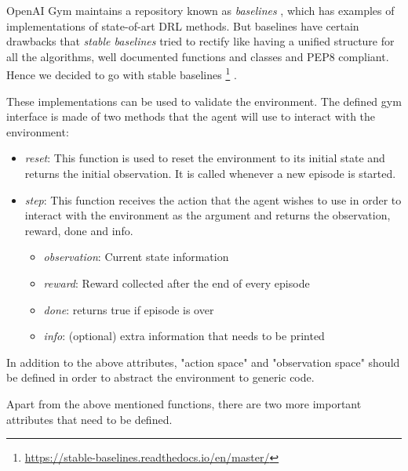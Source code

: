 \documentclass[12pt]{report}
\begin{document}
OpenAI Gym maintains a repository known as \emph{baselines} \cite{baselines}, which has examples of implementations of state-of-art DRL methods. But baselines have certain drawbacks that \emph{stable baselines} tried to rectify like having a unified structure for all the algorithms, well documented functions and classes and PEP8 compliant. Hence we decided to go with stable baselines \footnote{\url{https://stable-baselines.readthedocs.io/en/master/}}  \cite{stable-baselines}. 

These implementations can be used to validate the environment. The defined gym interface is made of two methods that the agent will use to interact with the environment:

\begin{itemize}
    \item \emph{reset}: This function is used to reset the environment to its initial state and returns the initial observation. It is called whenever a new episode is started. 
    \item \emph{step}: This function receives the action that the agent wishes to use in order to interact with the environment as the argument and returns the observation, reward, done and info. 
    \begin{itemize}
        \item \emph{observation}: Current state information
        \item \emph{reward}: Reward collected after the end of every episode
        \item \emph{done}: returns true if episode is over
        \item\emph{info}: (optional) extra information that needs to be printed
    \end{itemize}
\end{itemize}

In addition to the above attributes, "action space" and "observation space" should be defined in order to abstract the environment to generic code. 

Apart from the above mentioned functions, there are two more important attributes that need to be defined. 
\end{document}
